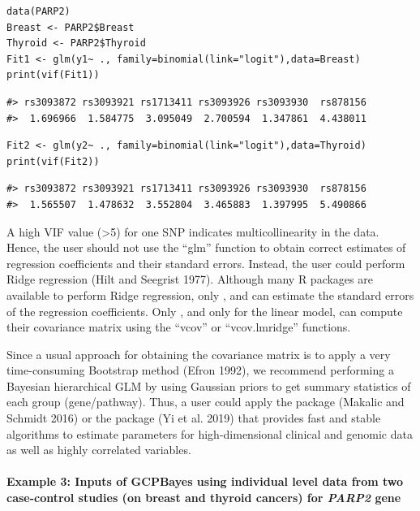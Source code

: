 \begin{verbatim}
data(PARP2)
Breast <- PARP2$Breast
Thyroid <- PARP2$Thyroid
Fit1 <- glm(y1~ ., family=binomial(link="logit"),data=Breast)
print(vif(Fit1))
\end{verbatim}

\begin{verbatim}
#> rs3093872 rs3093921 rs1713411 rs3093926 rs3093930  rs878156 
#>  1.696966  1.584775  3.095049  2.700594  1.347861  4.438011
\end{verbatim}

\begin{verbatim}
Fit2 <- glm(y2~ ., family=binomial(link="logit"),data=Thyroid)
print(vif(Fit2))
\end{verbatim}

\begin{verbatim}
#> rs3093872 rs3093921 rs1713411 rs3093926 rs3093930  rs878156 
#>  1.565507  1.478632  3.552804  3.465883  1.397995  5.490866
\end{verbatim}

A high VIF value (\textgreater5) for one SNP indicates multicollinearity in the data. Hence, the user should not use the ``glm'' function to obtain correct estimates of regression coefficients and their standard errors. Instead, the user could perform Ridge regression (Hilt and Seegrist 1977). Although many R packages are available to perform Ridge regression, only ,  and  can estimate the standard errors of the regression coefficients. Only , and only for the linear model, can compute their covariance matrix using the ``vcov'' or ``vcov.lmridge'' functions.

Since a usual approach for obtaining the covariance matrix is to apply a very time-consuming Bootstrap method (Efron 1992), we recommend performing a Bayesian hierarchical GLM by using Gaussian priors to get summary statistics of each group (gene/pathway).
Thus, a user could apply the  package (Makalic and Schmidt 2016) or the  package (Yi et al. 2019) that provides fast and stable algorithms to estimate parameters for high-dimensional clinical and genomic data as well as highly correlated variables.

\hypertarget{example-3-inputs-of-gcpbayes-using-individual-level-data-from-two-case-control-studies-on-breast-and-thyroid-cancers-for-parp2-gene}{%
\paragraph{\texorpdfstring{Example 3: Inputs of GCPBayes using individual level data from two case-control studies (on breast and thyroid cancers) for \emph{PARP2} gene}{Example 3: Inputs of GCPBayes using individual level data from two case-control studies (on breast and thyroid cancers) for PARP2 gene}}\label{example-3-inputs-of-gcpbayes-using-individual-level-data-from-two-case-control-studies-on-breast-and-thyroid-cancers-for-parp2-gene}}

